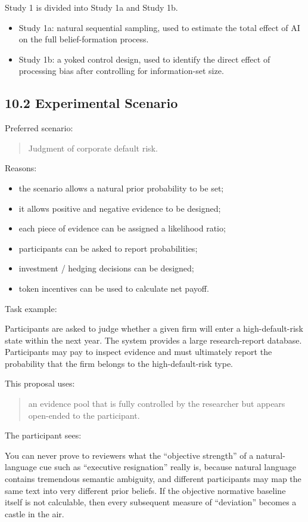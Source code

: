 Study 1 is divided into Study 1a and Study 1b.
\begin{itemize}[leftmargin=1.5em]
\item Study 1a: natural sequential sampling, used to estimate the total effect of AI on the full belief-formation process.
\item Study 1b: a yoked control design, used to identify the direct effect of processing bias after controlling for information-set size.
\end{itemize}

\subsection*{10.2 Experimental Scenario}

Preferred scenario:
\begin{quote}
Judgment of corporate default risk.
\end{quote}

Reasons:
\begin{itemize}[leftmargin=1.5em]
\item the scenario allows a natural prior probability to be set;
\item it allows positive and negative evidence to be designed;
\item each piece of evidence can be assigned a likelihood ratio;
\item participants can be asked to report probabilities;
\item investment / hedging decisions can be designed;
\item token incentives can be used to calculate net payoff.
\end{itemize}

Task example:

Participants are asked to judge whether a given firm will enter a high-default-risk state within the next year. The system provides a large research-report database. Participants may pay to inspect evidence and must ultimately report the probability that the firm belongs to the high-default-risk type.

This proposal uses:
\begin{quote}
an evidence pool that is fully controlled by the researcher but appears open-ended to the participant.
\end{quote}

The participant sees:

You can never prove to reviewers what the ``objective strength'' of a natural-language cue such as ``executive resignation'' really is, because natural language contains tremendous semantic ambiguity, and different participants may map the same text into very different prior beliefs. If the objective normative baseline itself is not calculable, then every subsequent measure of ``deviation'' becomes a castle in the air.

